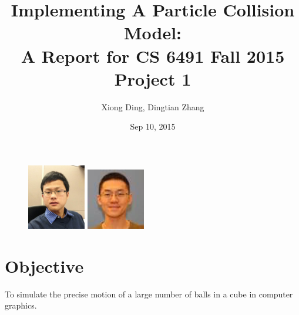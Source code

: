 \documentclass[twoside,10pt]{article}
\begin{document}
\title{Implementing A Particle Collision Model: \\ \large A Report for CS 6491 Fall 2015 Project 1}
\author{Xiong Ding, Dingtian Zhang}
\date{Sep 10, 2015}
\maketitle
\begin{figure} [H]
    \centering
    \includegraphics[width=1.0in]{selfie}
    \includegraphics[width=1.0in]{pic_alan}
\end{figure}




\section{Objective}

To simulate the precise motion of a large number of balls in a cube in computer graphics. 
\end{document}
